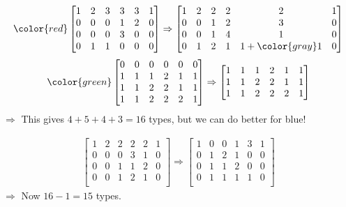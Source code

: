 \begin{frame}
        \begin{align*}
        \color{red}
        \begin{bmatrix}
             1&2&3&3&3&1\\
             0&0&0&1&2&0\\
             0&0&0&3&0&0\\
             0&1&1&0&0&0\\
        \end{bmatrix}\Rightarrow \begin{bmatrix}
            1&2&2&2&2&1\\
             0&0&1&2&3&0\\
             0&0&1&4&1&0\\
            0&1&2&1&1+\color{gray}1&0\\
        \end{bmatrix}
    \end{align*}
    \begin{align*}
    \color{green}
        \begin{bmatrix}
             0&0&0&0&0&0\\
             1&1&1&2&1&1\\
             1&1&2&2&1&1\\
             1&1&2&2&2&1\\
        \end{bmatrix}\Rightarrow
        \begin{bmatrix}
             1&1&1&2&1&1\\
             1&1&2&2&1&1\\
             1&1&2&2&2&1\\
        \end{bmatrix}
    \end{align*}
    $\Rightarrow$ This gives $4+5+4+3=16$ types, but we can do better for blue!
\end{frame}
\begin{frame}
\begin{align*}
    \begin{bmatrix}
        1&2&2&2&2&1\\
        0&0&0&3&1&0\\
        0&0&1&1&2&0\\
        0&0&1&2&1&0\\
    \end{bmatrix} \Rightarrow \begin{bmatrix}
	    1& 0& 0& 1& 3& 1\\
	    0& 1& 2& 1& 0& 0\\
	    0& 1& 1& 2& 0& 0\\
	    0& 1& 1& 1& 1& 0 \\
    \end{bmatrix}
	\end{align*}
    $\Rightarrow$ Now $16-1=15$ types.
\end{frame}

